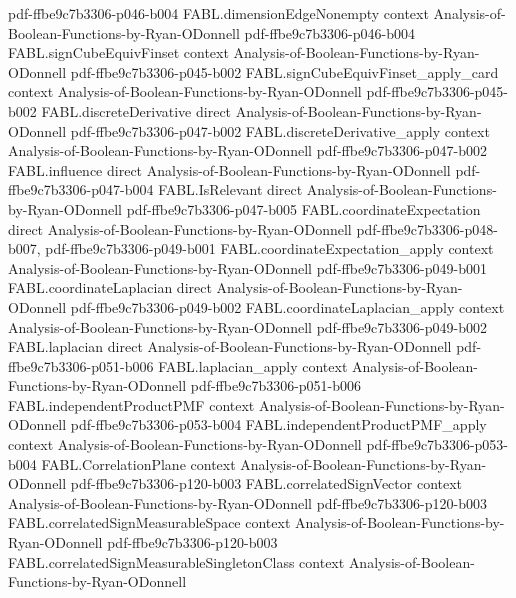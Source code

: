 \begin{theorem}
  {pdf-ffbe9c7b3306-p046-b004}
\proofstep
  {FABL.dimensionEdgeNonempty}
  {context}
  {Analysis-of-Boolean-Functions-by-Ryan-ODonnell}
  {pdf-ffbe9c7b3306-p046-b004}
\proofstep
  {FABL.signCubeEquivFinset}
  {context}
  {Analysis-of-Boolean-Functions-by-Ryan-ODonnell}
  {pdf-ffbe9c7b3306-p045-b002}
\proofstep
  {FABL.signCubeEquivFinset_apply_card}
  {context}
  {Analysis-of-Boolean-Functions-by-Ryan-ODonnell}
  {pdf-ffbe9c7b3306-p045-b002}
\proofstep
  {FABL.discreteDerivative}
  {direct}
  {Analysis-of-Boolean-Functions-by-Ryan-ODonnell}
  {pdf-ffbe9c7b3306-p047-b002}
\proofstep
  {FABL.discreteDerivative_apply}
  {context}
  {Analysis-of-Boolean-Functions-by-Ryan-ODonnell}
  {pdf-ffbe9c7b3306-p047-b002}
\proofstep
  {FABL.influence}
  {direct}
  {Analysis-of-Boolean-Functions-by-Ryan-ODonnell}
  {pdf-ffbe9c7b3306-p047-b004}
\proofstep
  {FABL.IsRelevant}
  {direct}
  {Analysis-of-Boolean-Functions-by-Ryan-ODonnell}
  {pdf-ffbe9c7b3306-p047-b005}
\proofstep
  {FABL.coordinateExpectation}
  {direct}
  {Analysis-of-Boolean-Functions-by-Ryan-ODonnell}
  {pdf-ffbe9c7b3306-p048-b007,
    pdf-ffbe9c7b3306-p049-b001}
\proofstep
  {FABL.coordinateExpectation_apply}
  {context}
  {Analysis-of-Boolean-Functions-by-Ryan-ODonnell}
  {pdf-ffbe9c7b3306-p049-b001}
\proofstep
  {FABL.coordinateLaplacian}
  {direct}
  {Analysis-of-Boolean-Functions-by-Ryan-ODonnell}
  {pdf-ffbe9c7b3306-p049-b002}
\proofstep
  {FABL.coordinateLaplacian_apply}
  {context}
  {Analysis-of-Boolean-Functions-by-Ryan-ODonnell}
  {pdf-ffbe9c7b3306-p049-b002}
\proofstep
  {FABL.laplacian}
  {direct}
  {Analysis-of-Boolean-Functions-by-Ryan-ODonnell}
  {pdf-ffbe9c7b3306-p051-b006}
\proofstep
  {FABL.laplacian_apply}
  {context}
  {Analysis-of-Boolean-Functions-by-Ryan-ODonnell}
  {pdf-ffbe9c7b3306-p051-b006}
\proofstep
  {FABL.independentProductPMF}
  {context}
  {Analysis-of-Boolean-Functions-by-Ryan-ODonnell}
  {pdf-ffbe9c7b3306-p053-b004}
\proofstep
  {FABL.independentProductPMF_apply}
  {context}
  {Analysis-of-Boolean-Functions-by-Ryan-ODonnell}
  {pdf-ffbe9c7b3306-p053-b004}
\proofstep
  {FABL.CorrelationPlane}
  {context}
  {Analysis-of-Boolean-Functions-by-Ryan-ODonnell}
  {pdf-ffbe9c7b3306-p120-b003}
\proofstep
  {FABL.correlatedSignVector}
  {context}
  {Analysis-of-Boolean-Functions-by-Ryan-ODonnell}
  {pdf-ffbe9c7b3306-p120-b003}
\proofstep
  {FABL.correlatedSignMeasurableSpace}
  {context}
  {Analysis-of-Boolean-Functions-by-Ryan-ODonnell}
  {pdf-ffbe9c7b3306-p120-b003}
\proofstep
  {FABL.correlatedSignMeasurableSingletonClass}
  {context}
  {Analysis-of-Boolean-Functions-by-Ryan-ODonnell}

\end{theorem}
